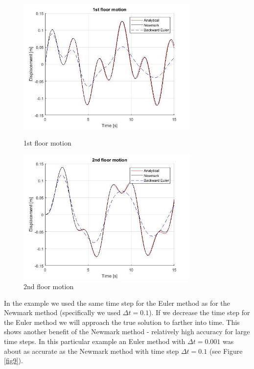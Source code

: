 \documentclass{article}
\begin{document}
				\begin{figure}[h!]
  					\centering
 				 	\begin{minipage}[b]{0.4\textwidth}
    						\includegraphics[width=90mm]{pictures/1floor.jpg}
						\caption{1st floor motion}
						\label{fig7}
  					\end{minipage}
 					 \hfill
					\begin{minipage}[b]{0.4\textwidth}
 				  	 	\includegraphics[width=90mm]{pictures/2floor.jpg}
						\caption{2nd floor motion}
						\label{fig8}
 					 \end{minipage}
				\end{figure}
In the example we used the same time step for the Euler method as for the Newmark method (specifically we used $\Delta t = 0.1$). If we decrease the time step for the Euler method we will approach the true solution to farther into time. This shows another benefit of the Newmark method - relatively high accuracy for large time steps. In this particular example an Euler method with $\Delta t = 0.001$ was about as accurate as the Newmark method with time step $\Delta t = 0.1$ (see Figure \ref{fig9}). 
\end{document}
